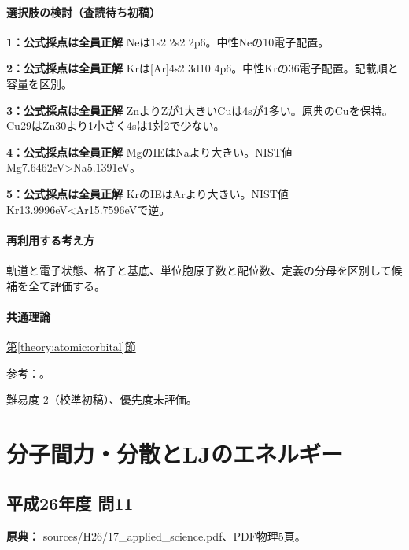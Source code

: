 \paragraph{選択肢の検討（査読待ち初稿）}\mbox{}\par

\noindent\textbf{1：公式採点は全員正解} Neは1s2 2s2 2p6。中性Neの10電子配置。\par

\noindent\textbf{2：公式採点は全員正解} Krは[Ar]4s2 3d10 4p6。中性Krの36電子配置。記載順と容量を区別。\par

\noindent\textbf{3：公式採点は全員正解} ZnよりZが1大きいCuは4sが1多い。原典のCuを保持。Cu29はZn30より1小さく4sは1対2で少ない。\par

\noindent\textbf{4：公式採点は全員正解} MgのIEはNaより大きい。NIST値Mg7.6462eV>Na5.1391eV。\par

\noindent\textbf{5：公式採点は全員正解} KrのIEはArより大きい。NIST値Kr13.9996eV<Ar15.7596eVで逆。\par

\paragraph{再利用する考え方} 軌道と電子状態、格子と基底、単位胞原子数と配位数、定義の分母を区別して候補を全て評価する。

\paragraph{共通理論} \hyperref[theory:atomic:orbital]{第\ref*{theory:atomic:orbital}節}

\par 参考：\cite{atomic_nist2019}。

\par 難易度 2（校準初稿）、優先度未評価。

\section{分子間力・分散とLJのエネルギー}

\subsection{平成26年度 問11}
\label{q:h26-reg-applied-11}

\noindent\textbf{原典：} sources/H26/17\_applied\_science.pdf、PDF物理5頁。


